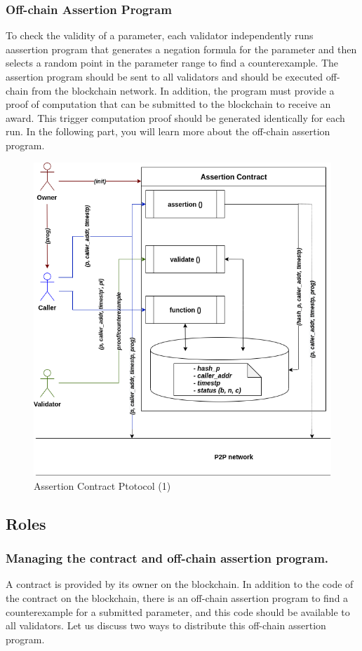 \documentclass[runningheads]{llncs}
\begin{document}
\subsubsection{Off-chain Assertion Program}
To check the validity of a parameter, each validator independently runs aassertion program that generates a negation formula for the parameter and then selects a random point in the parameter range to find a counterexample. The assertion program should be sent to all validators and should be executed off-chain from the blockchain network. In addition, the program must provide a proof of computation that can be submitted to the blockchain to receive an award. This trigger computation proof should be generated identically for each run. In the following part, you will learn more about the off-chain assertion program.
\begin{figure}
\centering
\includegraphics[scale=.6]{assertion_1}
\caption{Assertion Contract Ptotocol (1)}
\end{figure}

\subsection{Roles}
\subsubsection{Managing the contract and off-chain assertion program.}
A contract is provided by its owner on the blockchain. In addition to the code of the contract on the blockchain, there is an off-chain assertion program to find a counterexample for a submitted parameter, and this code should be available to all validators. Let us discuss two ways to distribute this off-chain assertion program.
\end{document}
